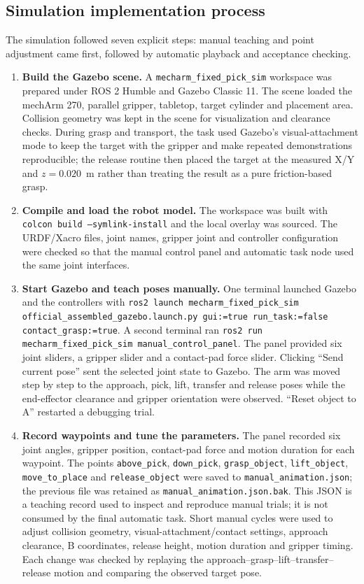 \documentclass[11pt,a4paper]{article}
\newcommand{\code}[1]{\texttt{\footnotesize #1}}
\begin{document}
\subsection{Simulation implementation process}
The simulation followed seven explicit steps: manual teaching and point adjustment came first, followed by automatic playback and acceptance checking.
\begin{enumerate}
\item \textbf{Build the Gazebo scene.} A \code{mecharm\_fixed\_pick\_sim} workspace was prepared under ROS 2 Humble and Gazebo Classic 11. The scene loaded the mechArm 270, parallel gripper, tabletop, target cylinder and placement area. Collision geometry was kept in the scene for visualization and clearance checks. During grasp and transport, the task used Gazebo's visual-attachment mode to keep the target with the gripper and make repeated demonstrations reproducible; the release routine then placed the target at the measured X/Y and $z=0.020$~m rather than treating the result as a pure friction-based grasp.
\item \textbf{Compile and load the robot model.} The workspace was built with \code{colcon build --symlink-install} and the local overlay was sourced. The URDF/Xacro files, joint names, gripper joint and controller configuration were checked so that the manual control panel and automatic task node used the same joint interfaces.
\item \textbf{Start Gazebo and teach poses manually.} One terminal launched Gazebo and the controllers with \code{ros2 launch mecharm\_fixed\_pick\_sim official\_assembled\_gazebo.launch.py gui:=true run\_task:=false contact\_grasp:=true}. A second terminal ran \code{ros2 run mecharm\_fixed\_pick\_sim manual\_control\_panel}. The panel provided six joint sliders, a gripper slider and a contact-pad force slider. Clicking ``Send current pose'' sent the selected joint state to Gazebo. The arm was moved step by step to the approach, pick, lift, transfer and release poses while the end-effector clearance and gripper orientation were observed. ``Reset object to A'' restarted a debugging trial.
\item \textbf{Record waypoints and tune the parameters.} The panel recorded six joint angles, gripper position, contact-pad force and motion duration for each waypoint. The points \code{above\_pick}, \code{down\_pick}, \code{grasp\_object}, \code{lift\_object}, \code{move\_to\_place} and \code{release\_object} were saved to \code{manual\_animation.json}; the previous file was retained as \code{manual\_animation.json.bak}. This JSON is a teaching record used to inspect and reproduce manual trials; it is not consumed by the final automatic task. Short manual cycles were used to adjust collision geometry, visual-attachment/contact settings, approach clearance, B coordinates, release height, motion duration and gripper timing. Each change was checked by replaying the approach--grasp--lift--transfer--release motion and comparing the observed target pose.

\end{enumerate}
\end{document}
